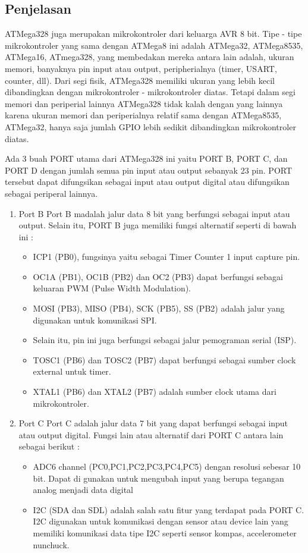 	\subsection{Penjelasan}
	ATMega328 juga merupakan mikrokontroler dari keluarga AVR 8 bit. Tipe - tipe mikrokontroler yang sama dengan ATMega8 ini adalah ATMega32, ATMega8535, ATMega16, ATmega328, yang membedakan mereka antara lain adalah, ukuran memori, banyaknya pin input atau output, peripherialnya (timer, USART, counter, dll). Dari segi fisik, ATMega328 memiliki ukuran yang lebih kecil dibandingkan dengan mikrokontroler - mikrokontroler diatas. Tetapi dalam segi memori dan periperial lainnya ATMega328 tidak kalah dengan yang lainnya karena ukuran memori dan periperialnya relatif sama dengan ATMega8535, ATMega32, hanya saja jumlah GPIO lebih sedikit dibandingkan mikrokontroler diatas.

	Ada 3 buah PORT utama dari ATMega328 ini yaitu PORT B, PORT C, dan PORT D dengan jumlah semua pin input atau output sebanyak 23 pin. PORT tersebut dapat difungsikan sebagai input atau output digital atau difungsikan sebagai periperal lainnya.
	\begin{enumerate}
	\item Port B 
		Port B madalah jalur data 8 bit yang berfungsi sebagai input atau output. Selain itu, PORT B juga memiliki fungsi alternatif seperti di bawah ini :
		\begin{itemize}
			\item ICP1 (PB0), fungsinya yaitu sebagai Timer Counter 1 input capture pin. 
			\item OC1A (PB1), OC1B (PB2) dan OC2 (PB3) dapat berfungsi sebagai keluaran PWM (Pulse Width Modulation).
			\item MOSI (PB3), MISO (PB4), SCK (PB5), SS (PB2) adalah jalur yang digunakan untuk komunikasi SPI.
			\item Selain itu, pin ini juga berfungsi sebagai jalur pemograman serial (ISP).
			\item TOSC1 (PB6) dan TOSC2 (PB7) dapat berfungsi sebagai sumber clock external untuk timer.
			\item XTAL1 (PB6) dan XTAL2 (PB7) adalah sumber clock utama dari mikrokontroler.
		\end{itemize}
		
	\item Port C
		Port C adalah jalur data 7 bit yang dapat berfungsi sebagai input atau output digital. Fungsi lain atau alternatif dari PORT C antara lain sebagai berikut :
		\begin {itemize}
			\item ADC6 channel (PC0,PC1,PC2,PC3,PC4,PC5) dengan resolusi sebesar 10 bit. Dapat di gunakan untuk mengubah input yang berupa tegangan analog menjadi data digital
			\item I2C (SDA dan SDL) adalah salah satu fitur yang terdapat pada PORT C. I2C digunakan untuk komunikasi dengan sensor atau device lain yang memiliki komunikasi data tipe I2C seperti sensor kompas, accelerometer nunchuck. 
		\end {itemize}

	\end{enumerate}
